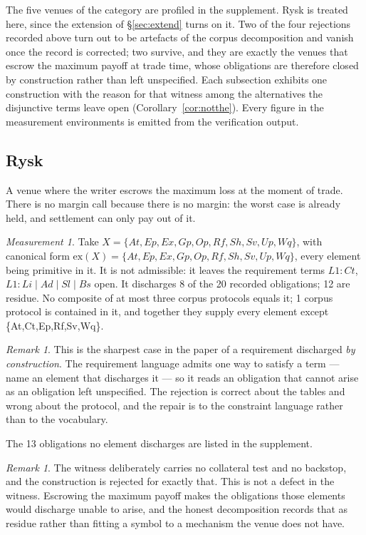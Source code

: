 \documentclass[11pt,reqno]{amsart}
\theoremstyle{plain}
\theoremstyle{definition}
\theoremstyle{remark}
\newtheorem{measurement}[theorem]{Measurement}
\newtheorem{remark}[theorem]{Remark}
\begin{document}
The five venues of the category are profiled in the supplement. Rysk is
treated here, since the extension of \S\ref{sec:extend} turns on it. Two of the four rejections
recorded above turn out to be artefacts of the corpus decomposition and vanish
once the record is corrected; two survive, and they are exactly the venues that
escrow the maximum payoff at trade time, whose obligations are therefore closed
by construction rather than left unspecified. Each subsection exhibits one
construction with the reason for that witness among the alternatives the
disjunctive terms leave open (Corollary~\ref{cor:notthe}). Every figure in the
measurement environments is emitted from the verification output.

\subsection{Rysk}\label{case:opt:rysk}

A venue where the writer escrows the maximum loss at the moment of trade. There is no margin call because there is no margin: the worst case is already held, and settlement can only pay out of it.

\begin{measurement}\label{meas:case:opt:rysk}
Take $X = \{At,Ep,Ex,Gp,Op,Rf,Sh,Sv,Up,Wq\}$, with canonical form
$\mathrm{ex}(X) = \{At,Ep,Ex,Gp,Op,Rf,Sh,Sv,Up,Wq\}$, every element being primitive in it.
It is not admissible: it leaves the requirement terms $L1\!:\!Ct$, $L1\!:\!Li{\mid}Ad{\mid}Sl{\mid}Bs$ open. It discharges 8 of the 20 recorded obligations; 12 are residue. No composite of at most three corpus protocols equals it; 1 corpus protocol is contained in it, and together they supply every element except \{At,Ct,Ep,Rf,Sv,Wq\}.
\end{measurement}

\begin{remark}
This is the sharpest case in the paper of a requirement discharged \emph{by construction}. The requirement language admits one way to satisfy a term --- name an element that discharges it --- so it reads an obligation that cannot arise as an obligation left unspecified. The rejection is correct about the tables and wrong about the protocol, and the repair is to the constraint language rather than to the vocabulary.

The 13 obligations no element discharges are listed in the supplement.
\end{remark}

\begin{remark}
The witness deliberately carries no collateral test and no backstop, and the construction is rejected for exactly that. This is not a defect in the witness. Escrowing the maximum payoff makes the obligations those elements would discharge unable to arise, and the honest decomposition records that as residue rather than fitting a symbol to a mechanism the venue does not have.
\end{remark}
\end{document}
